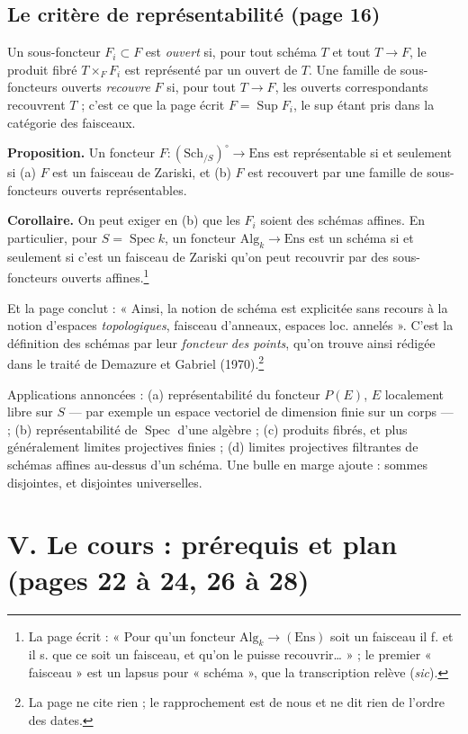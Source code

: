\documentclass[11pt,a4paper]{article}
\begin{document}
\subsection*{Le critère de représentabilité (page 16)}

Un sous-foncteur $F_i \subset F$ est \emph{ouvert} si, pour tout schéma $T$ et
tout $T \to F$, le produit fibré $T \times_F F_i$ est représenté par un ouvert
de $T$. Une famille de sous-foncteurs ouverts \emph{recouvre} $F$ si, pour
tout $T \to F$, les ouverts correspondants recouvrent $T$ ; c'est ce que la page
écrit $F = \operatorname{Sup} F_i$, le sup étant pris dans la catégorie des
faisceaux.

\textbf{Proposition.} Un foncteur $F : (\mathrm{Sch}_{/S})^{\circ} \to \mathrm{Ens}$
est représentable si et seulement si (a) $F$ est un faisceau de Zariski, et
(b) $F$ est recouvert par une famille de sous-foncteurs ouverts représentables.

\textbf{Corollaire.} On peut exiger en (b) que les $F_i$ soient des schémas
affines. En particulier, pour $S = \operatorname{Spec} k$, un foncteur
$\mathrm{Alg}_k \to \mathrm{Ens}$ est un schéma si et seulement si c'est un
faisceau de Zariski qu'on peut recouvrir par des sous-foncteurs ouverts
affines.\footnote{La page écrit : « Pour qu'un foncteur $\mathrm{Alg}_k \to
(\mathrm{Ens})$ soit un faisceau il f. et il s. que ce soit un faisceau, et
qu'on le puisse recouvrir… » ; le premier « faisceau » est un lapsus pour
« schéma », que la transcription relève (\emph{sic}).}

Et la page conclut : « Ainsi, la notion de schéma est explicitée sans recours à
la notion d'espaces \emph{topologiques}, faisceau d'anneaux, espaces loc.
annelés ». C'est la définition des schémas par leur \emph{foncteur des points},
qu'on trouve ainsi rédigée dans le traité de Demazure et Gabriel (1970).\footnote{La
page ne cite rien ; le rapprochement est de nous et ne dit rien de l'ordre des
dates.}

Applications annoncées : (a) représentabilité du foncteur $P(E)$, $E$ localement
libre sur $S$ --- par exemple un espace vectoriel de dimension finie sur un
corps --- ; (b) représentabilité de $\operatorname{Spec}$ d'une algèbre ; (c)
produits fibrés, et plus généralement limites projectives finies ; (d) limites
projectives filtrantes de schémas affines au-dessus d'un schéma. Une bulle en
marge ajoute : sommes disjointes, et disjointes universelles.

\section*{V. Le cours : prérequis et plan (pages 22 à 24, 26 à 28)}
\end{document}
